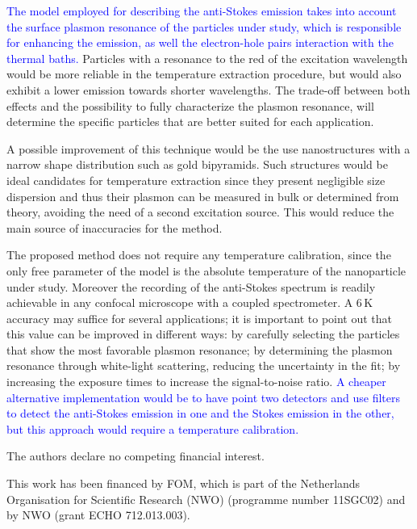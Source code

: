 \documentclass[journal=nalefd,manuscript=letter]{achemso}
\newcommand{\HI}[1]{\textcolor{blue}{#1}} %
\newcommand{\K}{\ensuremath{\,\textrm{K}}}
\begin{document}
\HI{The model employed for describing the anti-Stokes emission takes into account
the surface plasmon resonance of the particles under study, which is responsible 
for enhancing the emission, as well the electron-hole pairs
interaction with the thermal baths.}
Particles with a resonance to the red of the excitation wavelength would be more
reliable in the temperature extraction procedure, but would also exhibit a lower
emission towards shorter wavelengths. The trade-off between both effects and
the possibility to fully characterize the plasmon resonance, will determine the
specific particles that are better suited for each application.

A possible improvement of this technique would be the use nanostructures with a
narrow shape distribution such as gold bipyramids\cite{Pelton2009}. Such
structures would be ideal candidates for temperature extraction since they
present negligible size dispersion and thus their plasmon can be measured in
bulk or determined from theory, avoiding the need of a second excitation source.
This would reduce the main source of inaccuracies for the method.

The proposed method does not require any temperature calibration, since the only free
parameter of the model is the absolute temperature of the nanoparticle under
study. Moreover the recording of the anti-Stokes spectrum is readily achievable
in any confocal microscope with a coupled spectrometer. A $6\K$ accuracy may
suffice for several applications; it is important to point out that this value
can be improved in different ways: by carefully selecting the particles that
show the most favorable plasmon resonance; by determining the plasmon resonance
through white-light scattering, reducing the uncertainty in the fit; by
increasing the exposure times to increase the signal-to-noise ratio. 
\HI{A cheaper alternative implementation would be to have point two detectors and use 
filters to detect the anti-Stokes emission in one and the Stokes emission in the other, 
but this approach would require a temperature calibration.}

The authors declare no competing financial interest.

\begin{acknowledgement}
This work has been financed by FOM, which is part of the Netherlands Organisation for Scientific Research (NWO)
(programme number 11SGC02) and by NWO (grant ECHO 712.013.003). 
\end{acknowledgement}
\end{document}
